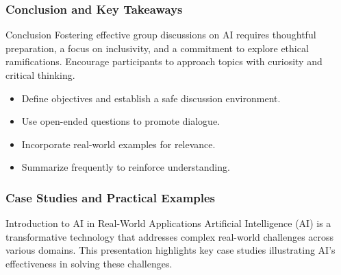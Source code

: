\documentclass{beamer}
\begin{document}
\begin{frame}[fragile]
    \frametitle{Conclusion and Key Takeaways}
    \begin{block}{Conclusion}
        Fostering effective group discussions on AI requires thoughtful preparation, a focus on inclusivity, and a commitment to explore ethical ramifications. Encourage participants to approach topics with curiosity and critical thinking.
    \end{block}
    \begin{itemize}
        \item Define objectives and establish a safe discussion environment.
        \item Use open-ended questions to promote dialogue.
        \item Incorporate real-world examples for relevance.
        \item Summarize frequently to reinforce understanding.
    \end{itemize}
\end{frame}

\begin{frame}[fragile]
    \frametitle{Case Studies and Practical Examples}
    \begin{block}{Introduction to AI in Real-World Applications}
        Artificial Intelligence (AI) is a transformative technology that addresses complex real-world challenges across various domains. This presentation highlights key case studies illustrating AI's effectiveness in solving these challenges.
    \end{block}
\end{frame}
\end{document}
